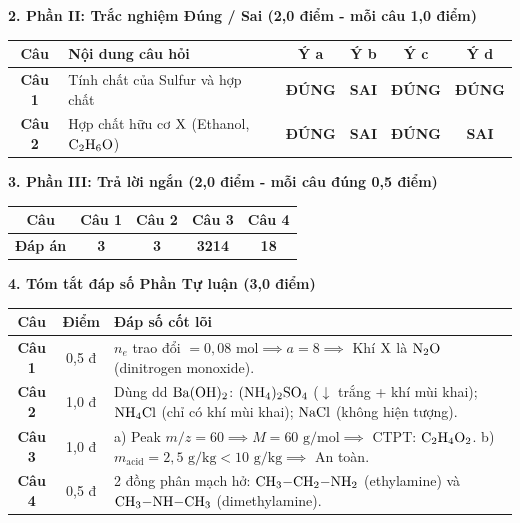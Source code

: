 \documentclass[11pt,a4paper]{article}
\begin{document}
\vspace{2pt}
\noindent
\textbf{\color{mainGreen}2. Phần II: Trắc nghiệm Đúng / Sai (2,0 điểm - mỗi câu 1,0 điểm)}
\begin{center}
\renewcommand{\arraystretch}{1.2}
\begin{tabular}{|c|l|c|c|c|c|}
\hline
\rowcolor{tableGreen}
\textbf{Câu} & \textbf{Nội dung câu hỏi} & \textbf{Ý a} & \textbf{Ý b} & \textbf{Ý c} & \textbf{Ý d} \\
\hline
\textbf{Câu 1} & Tính chất của Sulfur và hợp chất & \textbf{\color{hfRed}ĐÚNG} & \textbf{SAI} & \textbf{\color{hfRed}ĐÚNG} & \textbf{\color{hfRed}ĐÚNG} \\
\hline
\textbf{Câu 2} & Hợp chất hữu cơ $\ce{X}$ (Ethanol, $\ce{C2H6O}$) & \textbf{\color{hfRed}ĐÚNG} & \textbf{SAI} & \textbf{\color{hfRed}ĐÚNG} & \textbf{SAI} \\
\hline
\end{tabular}
\end{center}

\vspace{2pt}
\noindent
\textbf{\color{mainGreen}3. Phần III: Trả lời ngắn (2,0 điểm - mỗi câu đúng 0,5 điểm)}
\begin{center}
\renewcommand{\arraystretch}{1.2}
\begin{tabular}{|c|c|c|c|c|}
\hline
\rowcolor{tableGreen}
\textbf{Câu} & \textbf{Câu 1} & \textbf{Câu 2} & \textbf{Câu 3} & \textbf{Câu 4} \\
\hline
\textbf{Đáp án} & \textbf{\color{hfRed}3} & \textbf{\color{hfRed}3} & \textbf{\color{hfRed}3214} & \textbf{\color{hfRed}18} \\
\hline
\end{tabular}
\end{center}

\vspace{2pt}
\noindent
\textbf{\color{mainGreen}4. Tóm tắt đáp số Phần Tự luận (3,0 điểm)}
\begin{center}
\renewcommand{\arraystretch}{1.2}
\begin{tabular}{|c|c|p{11.5cm}|}
\hline
\rowcolor{tableGreen}
\textbf{Câu} & \textbf{Điểm} & \textbf{Đáp số cốt lõi} \\
\hline
\textbf{Câu 1} & 0,5 đ & $n_e$ trao đổi $= 0,08\text{ mol} \implies a = 8 \implies$ Khí $\ce{X}$ là $\ce{N2O}$ (dinitrogen monoxide). \\
\hline
\textbf{Câu 2} & 1,0 đ & Dùng dd $\ce{Ba(OH)2}$: $\ce{(NH4)2SO4}$ ($\downarrow$ trắng + khí mùi khai); $\ce{NH4Cl}$ (chỉ có khí mùi khai); $\ce{NaCl}$ (không hiện tượng). \\
\hline
\textbf{Câu 3} & 1,0 đ & a) Peak $m/z = 60 \implies M = 60\text{ g/mol} \implies$ CTPT: $\ce{C2H4O2}$. \quad b) $m_{\text{acid}} = 2,5\text{ g/kg} < 10\text{ g/kg} \implies$ An toàn. \\
\hline
\textbf{Câu 4} & 0,5 đ & 2 đồng phân mạch hở: $\ce{CH3-CH2-NH2}$ (ethylamine) và $\ce{CH3-NH-CH3}$ (dimethylamine). \\
\hline
\end{tabular}
\end{center}
\end{document}
